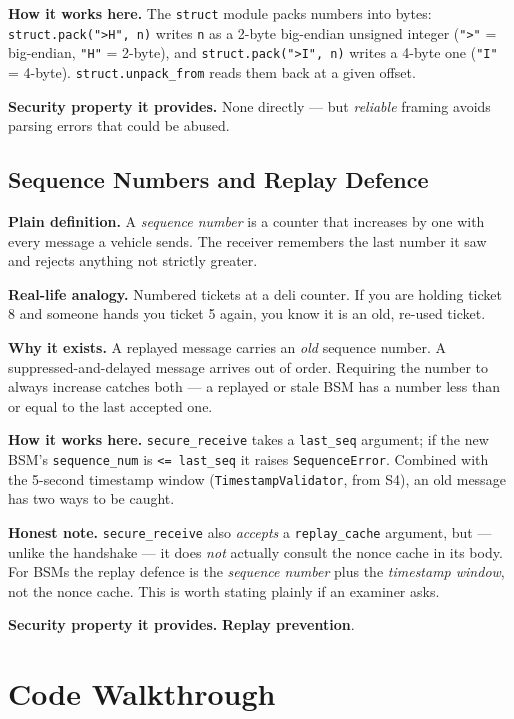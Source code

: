 \documentclass[11pt,a4paper]{report}
\begin{document}
\textbf{How it works here.} The \texttt{struct} module packs numbers into bytes:
\texttt{struct.pack(">H", n)} writes \texttt{n} as a 2-byte big-endian unsigned
integer (\texttt{">"} = big-endian, \texttt{"H"} = 2-byte), and
\texttt{struct.pack(">I", n)} writes a 4-byte one (\texttt{"I"} = 4-byte).
\texttt{struct.unpack\_from} reads them back at a given offset.

\textbf{Security property it provides.} None directly --- but \emph{reliable}
framing avoids parsing errors that could be abused.

\subsection{Sequence Numbers and Replay Defence}
\textbf{Plain definition.} A \emph{sequence number} is a counter that increases
by one with every message a vehicle sends. The receiver remembers the last
number it saw and rejects anything not strictly greater.

\textbf{Real-life analogy.} Numbered tickets at a deli counter. If you are
holding ticket 8 and someone hands you ticket 5 again, you know it is an old,
re-used ticket.

\textbf{Why it exists.} A replayed message carries an \emph{old} sequence number.
A suppressed-and-delayed message arrives out of order. Requiring the number to
always increase catches both --- a replayed or stale BSM has a number less than
or equal to the last accepted one.

\textbf{How it works here.} \texttt{secure\_receive} takes a \texttt{last\_seq}
argument; if the new BSM's \texttt{sequence\_num} is \texttt{<= last\_seq} it
raises \texttt{SequenceError}. Combined with the 5-second timestamp window
(\texttt{TimestampValidator}, from S4), an old message has two ways to be caught.

\textbf{Honest note.} \texttt{secure\_receive} also \emph{accepts} a
\texttt{replay\_cache} argument, but --- unlike the handshake --- it does
\emph{not} actually consult the nonce cache in its body. For BSMs the replay
defence is the \emph{sequence number} plus the \emph{timestamp window}, not the
nonce cache. This is worth stating plainly if an examiner asks.

\textbf{Security property it provides.} \textbf{Replay prevention}.

\section{Code Walkthrough}
\end{document}
